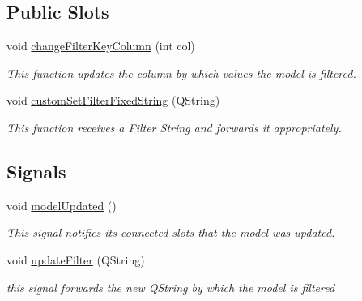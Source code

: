 \subsection*{Public Slots}
\begin{DoxyCompactItemize}
\item 
void \mbox{\hyperlink{class_q_custom_sort_filter_proxy_model_a32c931f0e638bb0f34090fd6beb622c8}{change\+Filter\+Key\+Column}} (int col)
\begin{DoxyCompactList}\small\item\em This function updates the column by which values the model is filtered. \end{DoxyCompactList}\item 
void \mbox{\hyperlink{class_q_custom_sort_filter_proxy_model_ace5bb8380d35be434b27a12afb10fd95}{custom\+Set\+Filter\+Fixed\+String}} (Q\+String)
\begin{DoxyCompactList}\small\item\em This function receives a Filter String and forwards it appropriately. \end{DoxyCompactList}\end{DoxyCompactItemize}
\subsection*{Signals}
\begin{DoxyCompactItemize}
\item 
\mbox{\label{class_q_custom_sort_filter_proxy_model_a5032cbe24943fa9956d35148a65d0c89}} 
void \mbox{\hyperlink{class_q_custom_sort_filter_proxy_model_a5032cbe24943fa9956d35148a65d0c89}{model\+Updated}} ()
\begin{DoxyCompactList}\small\item\em This signal notifies it\textquotesingle{}s connected slots that the model was updated. \end{DoxyCompactList}\item 
\mbox{\label{class_q_custom_sort_filter_proxy_model_a2449bf876853e7dcfc22a224873a8822}} 
void \mbox{\hyperlink{class_q_custom_sort_filter_proxy_model_a2449bf876853e7dcfc22a224873a8822}{update\+Filter}} (Q\+String)
\begin{DoxyCompactList}\small\item\em this signal forwards the new Q\+String by which the model is filtered \end{DoxyCompactList}\end{DoxyCompactItemize}
